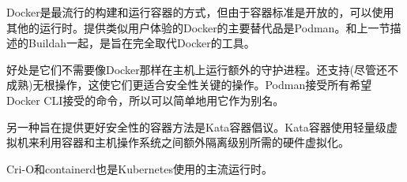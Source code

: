 
Docker是最流行的构建和运行容器的方式，但由于容器标准是开放的，可以使用其他的运行时。提供类似用户体验的Docker的主要替代品是Podman。和上一节描述的Buildah一起，是旨在完全取代Docker的工具。

好处是它们不需要像Docker那样在主机上运行额外的守护进程。还支持(尽管还不成熟)无根操作，这使它们更适合安全性关键的操作。Podman接受所有希望Docker CLI接受的命令，所以可以简单地用它作为别名。

另一种旨在提供更好安全性的容器方法是Kata容器倡议。Kata容器使用轻量级虚拟机来利用容器和主机操作系统之间额外隔离级别所需的硬件虚拟化。

Cri-O和containerd也是Kubernetes使用的主流运行时。


